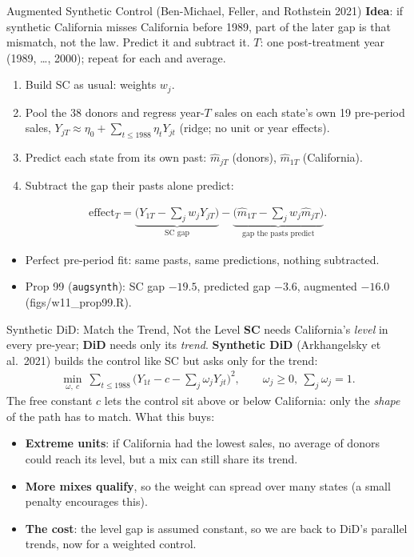 \documentclass[aspectratio=169,11pt,xcolor=dvipsnames]{beamer}
\newcommand{\srcp}[1]{{\scriptsize\color{gray}(#1)}}
\begin{document}
\begin{frame}{Augmented Synthetic Control \srcp{Ben-Michael, Feller, and Rothstein 2021}}
\textbf{Idea}: if synthetic California misses California before 1989, part of
the later gap is that mismatch, not the law. Predict it and subtract it. $T$: one
post-treatment year (1989, \dots, 2000); repeat for each and average.
\begin{enumerate}\itemsep2pt
  \item Build SC as usual: weights $w_j$.
  \item Pool the 38 donors and regress year-$T$ sales on each state's own 19
        pre-period sales, $Y_{jT} \approx \eta_0 + \sum_{t \leq 1988}\eta_t Y_{jt}$
        (ridge; no unit or year effects).
  \item Predict each state from its own past: $\hat m_{jT}$ (donors), $\hat m_{1T}$ (California).
  \item Subtract the gap their pasts alone predict:
\end{enumerate}
\vskip-8pt
\begin{align*}
  \text{effect}_T = \underbrace{\Big(Y_{1T} - \textstyle\sum_j w_j Y_{jT}\Big)}_{\text{SC gap}}
   - \underbrace{\Big(\hat m_{1T} - \textstyle\sum_j w_j \hat m_{jT}\Big)}_{\text{gap the pasts predict}} .
\end{align*}
\vskip-4pt
\begin{itemize}\itemsep1pt
  \item Perfect pre-period fit: same pasts, same predictions, nothing subtracted.
  \item Prop 99 (\texttt{augsynth}): SC gap $-19.5$, predicted gap $-3.6$,
        augmented $-16.0$ \srcp{figs/w11\_prop99.R}.
\end{itemize}
\end{frame}

\begin{frame}{Synthetic DiD: Match the Trend, Not the Level}
\textbf{SC} needs California's \emph{level} in every pre-year; \textbf{DiD} needs
only its \emph{trend}. \textbf{Synthetic DiD} \srcp{Arkhangelsky et al.\ 2021}
builds the control like SC but asks only for the trend:
\begin{align*}
  \min_{\omega,\ c}\ \textstyle\sum_{t\leq 1988}\Big(Y_{1t} - c - \sum_j \omega_j Y_{jt}\Big)^2,
  \qquad \omega_j \geq 0,\ \textstyle\sum_j\omega_j = 1 .
\end{align*}
The free constant $c$ lets the control sit above or below California: only the
\emph{shape} of the path has to match. What this buys:
\begin{itemize}\itemsep1pt
  \item \textbf{Extreme units}: if California had the lowest sales, no average of
        donors could reach its level, but a mix can still share its trend.
  \item \textbf{More mixes qualify}, so the weight can spread over many states
        (a small penalty encourages this).
  \item \textbf{The cost}: the level gap is assumed constant, so we are back to
        DiD's parallel trends, now for a weighted control.
\end{itemize}
\end{frame}
\end{document}
